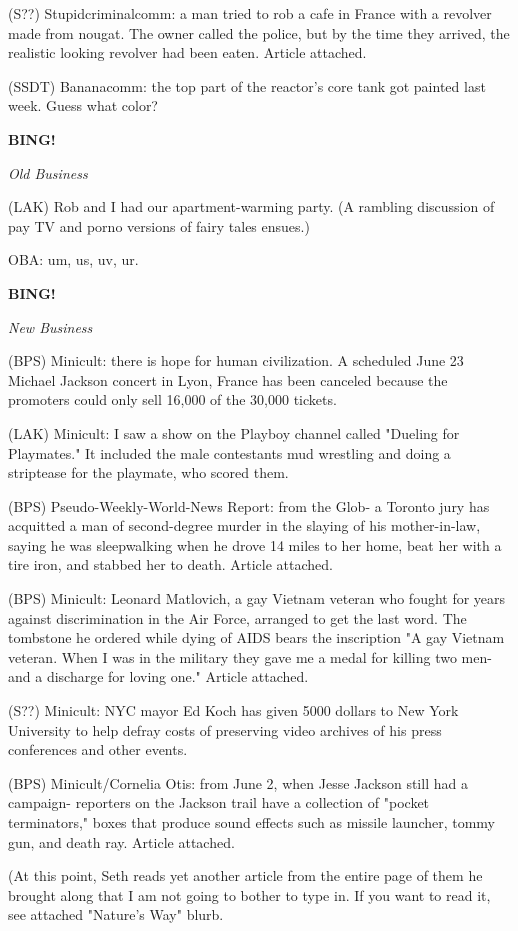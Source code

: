 \documentclass[12pt]{article}
\newcommand{\bing}{{\bf BING!} }
\newcommand{\goto}[1]{\bing \vskip 12pt \centerline{{\em{#1}}}}
\begin{document}
(S??) Stupidcriminalcomm: a man tried to rob a cafe in France with a revolver made from nougat. The owner called the police, but by the time they arrived, the realistic looking revolver had been eaten. Article attached.

(SSDT) Bananacomm: the top part of the reactor's core tank got painted last week. Guess what color?

\goto{Old Business}

(LAK) Rob and I had our apartment-warming party. (A rambling discussion of pay TV and porno versions of fairy tales ensues.)

OBA: um, us, uv, ur.

\goto{New Business}

(BPS) Minicult: there is hope for human civilization. A scheduled June 23 Michael Jackson concert in Lyon, France has been canceled because the promoters could only sell 16,000 of the 30,000 tickets.

(LAK) Minicult: I saw a show on the Playboy channel called "Dueling for Playmates." It included the male contestants mud wrestling and doing a striptease for the playmate, who scored them.

(BPS) Pseudo-Weekly-World-News Report: from the Glob- a Toronto jury has acquitted a man of second-degree murder in the slaying of his mother-in-law, saying he was sleepwalking when he drove 14 miles to her home, beat her with a tire iron, and stabbed her to death. Article attached.

(BPS) Minicult: Leonard Matlovich, a gay Vietnam veteran who fought for years against discrimination in the Air Force, arranged to get the last word. The tombstone he ordered while dying of AIDS bears the inscription "A gay Vietnam veteran. When I was in the military they gave me a medal for killing two men- and a discharge for loving one." Article attached.

(S??) Minicult: NYC mayor Ed Koch has given 5000 dollars to New York University to help defray costs of preserving video archives of his press conferences and other events.

(BPS) Minicult/Cornelia Otis: from June 2, when Jesse Jackson still had a campaign- reporters on the Jackson trail have a collection of "pocket terminators," boxes that produce sound effects such as missile launcher, tommy gun, and death ray. Article attached.

(At this point, Seth reads yet another article from the entire page of them he brought along that I am not going to bother to type in. If you want to read it, see attached "Nature's Way" blurb.
\end{document}
